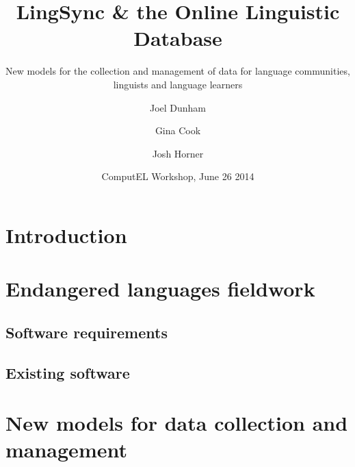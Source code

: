 \documentclass{beamer}
\begin{document}
\title[LingSync \& OLD] %
{LingSync \& the Online Linguistic Database}



\author[~]{Joel Dunham  \and Gina Cook  \and Josh Horner }
                 

\subtitle
{New models for the collection and management of data for language communities, linguists and
language learners}



\date[ComputEL 2014] %
{ComputEL Workshop, June 26 2014}





\begin{frame}
  \titlepage
\end{frame}

\section{Introduction}
\section{Endangered languages fieldwork}\label{sec:fieldwork}
\subsection{Software requirements}
\subsection{Existing software}
\section{New models for data collection and management}
\end{document}
